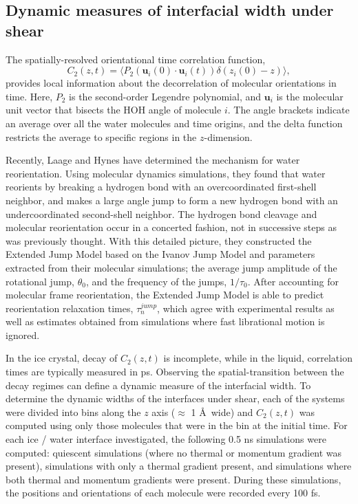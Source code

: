 \documentclass[journal = jpccck, manuscript = article]{achemso}
\begin{document}
\subsection{Dynamic measures of interfacial width under shear}
The spatially-resolved orientational time correlation function,
\begin{equation}\label{C(t)1}
  C_{2}(z,t)=\langle P_{2}(\mathbf{u}_i(0)\cdot \mathbf{u}_i(t))
  \delta(z_i(0) - z) \rangle,
\end{equation}
provides local information about the decorrelation of molecular
orientations in time. Here, $P_{2}$ is the second-order Legendre
polynomial, and $\mathbf{u}_i$ is the molecular unit vector that bisects
the HOH angle of molecule $i$. The angle brackets indicate an average
over all the water molecules and time origins, and the delta function
restricts the average to specific regions in the $z$-dimension. 

Recently, Laage and Hynes have determined the mechanism for water
reorientation.\cite{Laage2006,Laage2008} Using molecular dynamics
simulations, they found that water reorients by breaking a hydrogen
bond with an overcoordinated first-shell neighbor, and makes a large
angle jump to form a new hydrogen bond with an undercoordinated
second-shell neighbor.  The hydrogen bond cleavage and molecular
reorientation occur in a concerted fashion, not in successive steps as
was previously thought.  With this detailed picture, they constructed
the Extended Jump Model\cite{Laage2006,Laage2008} based on the Ivanov
Jump Model and parameters extracted from their molecular simulations;
the average jump amplitude of the rotational jump, $\theta_{0}$, and
the frequency of the jumps, $1/\tau_{0}$. After accounting for
molecular frame reorientation, the Extended Jump Model is able to
predict reorientation relaxation times, $\tau_{n}^{jump}$, which agree
with experimental results as well as estimates obtained from
simulations where fast librational motion is ignored.

In the ice crystal, decay of $C_2(z,t)$ is incomplete, while in the
liquid, correlation times are typically measured in ps. Observing the
spatial-transition between the decay regimes can define a dynamic
measure of the interfacial width.  To determine the dynamic widths of
the interfaces under shear, each of the systems were divided into bins
along the $z$ axis ($\approx$ 1 \AA\ wide) and $C_2(z,t)$ was computed
using only those molecules that were in the bin at the initial
time. For each ice / water interface investigated, the following 0.5
ns simulations were computed: quiescent simulations (where no thermal
or momentum gradient was present), simulations with only a thermal
gradient present, and simulations where both thermal and momentum
gradients were present. During these simulations, the positions and
orientations of each molecule were recorded every 100 fs.
\end{document}
